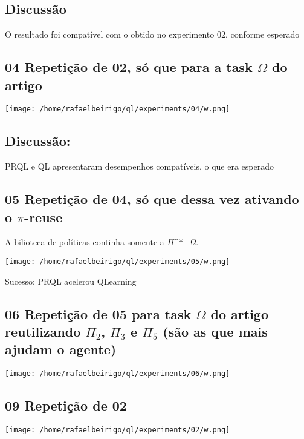 \documentclass[11pt]{article}
\begin{document}
\subsection{Discussão}
\label{sec-3.3}

O resultado foi compatível com o obtido no experimento 02, conforme esperado


\subsection{04 Repetição de 02, só que para a task $\Omega$ do artigo}
\label{sec-3.4}

\centerline{\texttt{[image: /home/rafaelbeirigo/ql/experiments/04/w.png]}}


\subsection{Discussão:}
\label{sec-3.5}

   PRQL e QL apresentaram desempenhos compatíveis, o que era esperado


\subsection{05 Repetição de 04, só que dessa vez ativando o $\pi$-reuse}
\label{sec-3.6}

A bilioteca de políticas continha somente a $\Pi$^*_$\Omega$.

\centerline{\texttt{[image: /home/rafaelbeirigo/ql/experiments/05/w.png]}}

  Sucesso: PRQL acelerou QLearning


\subsection{06 Repetição de 05 para task $\Omega$ do artigo reutilizando $\Pi$$_2$, $\Pi$$_3$ e $\Pi$$_5$ (são as que mais ajudam o agente)}
\label{sec-3.7}

\centerline{\texttt{[image: /home/rafaelbeirigo/ql/experiments/06/w.png]}}



\subsection{09 Repetição de 02}
\label{sec-3.8}

\centerline{\texttt{[image: /home/rafaelbeirigo/ql/experiments/02/w.png]}}
\end{document}
